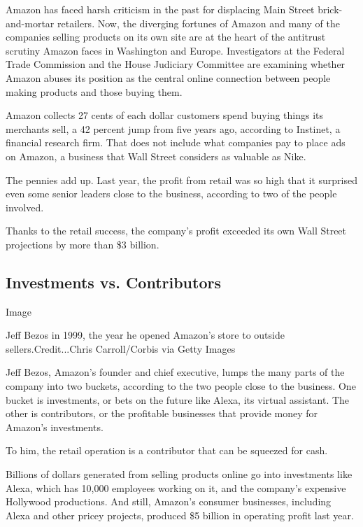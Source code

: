 Amazon has faced harsh criticism in the past for displacing Main Street
brick-and-mortar retailers. Now, the diverging fortunes of Amazon and
many of the companies selling products on its own site are at the heart
of the antitrust scrutiny Amazon faces in Washington and Europe.
Investigators at the Federal Trade Commission and the House Judiciary
Committee are examining whether Amazon abuses its position as the
central online connection between people making products and those
buying them.

Amazon collects 27 cents of each dollar customers spend buying things
its merchants sell, a 42 percent jump from five years ago, according to
Instinet, a financial research firm. That does not include what
companies pay to place ads on Amazon, a business that Wall Street
considers as valuable as Nike.

The pennies add up. Last year, the profit from retail was so high that
it surprised even some senior leaders close to the business, according
to two of the people involved.

Thanks to the retail success, the company's profit exceeded its own Wall
Street projections by more than \$3 billion.

\hypertarget{investments-vs-contributors}{%
\subsection{Investments vs.
Contributors}\label{investments-vs-contributors}}

Image

Jeff Bezos in 1999, the year he opened Amazon's store to outside
sellers.Credit...Chris Carroll/Corbis via Getty Images

Jeff Bezos, Amazon's founder and chief executive, lumps the many parts
of the company into two buckets, according to the two people close to
the business. One bucket is investments, or bets on the future like
Alexa, its virtual assistant. The other is contributors, or the
profitable businesses that provide money for Amazon's investments.

To him, the retail operation is a contributor that can be squeezed for
cash.

Billions of dollars generated from selling products online go into
investments like Alexa, which has 10,000 employees working on it, and
the company's expensive Hollywood productions. And still, Amazon's
consumer businesses, including Alexa and other pricey projects, produced
\$5 billion in operating profit last year.

